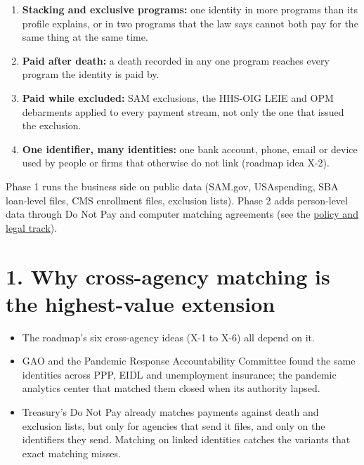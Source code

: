 \documentclass[letterpaper,11pt]{article}
\providecommand{\tightlist}{\setlength{\itemsep}{0pt}\setlength{\parskip}{0pt}}
\begin{document}
\begin{enumerate}
\def\labelenumi{\arabic{enumi}.}
\tightlist
\item
  \textbf{Stacking and exclusive programs:} one identity in more
  programs than its profile explains, or in two programs that the law
  says cannot both pay for the same thing at the same time.
\item
  \textbf{Paid after death:} a death recorded in any one program reaches
  every program the identity is paid by.
\item
  \textbf{Paid while excluded:} SAM exclusions, the HHS-OIG LEIE and OPM
  debarments applied to every payment stream, not only the one that
  issued the exclusion.
\item
  \textbf{One identifier, many identities:} one bank account, phone,
  email or device used by people or firms that otherwise do not link
  (roadmap idea X-2).
\end{enumerate}

Phase 1 runs the business side on public data (SAM.gov, USAspending, SBA
loan-level files, CMS enrollment files, exclusion lists). Phase 2 adds
person-level data through Do Not Pay and computer matching agreements
(see the \href{../policy/legal_track.pdf}{policy and legal track}).

\hypertarget{why-cross-agency-matching-is-the-highest-value-extension}{%
\section*{1. Why cross-agency matching is the highest-value
extension}\label{why-cross-agency-matching-is-the-highest-value-extension}}

\begin{itemize}
\tightlist
\item
  The roadmap's six cross-agency ideas (X-1 to X-6) all depend on it.
\item
  GAO and the Pandemic Response Accountability Committee found the same
  identities across PPP, EIDL and unemployment insurance; the pandemic
  analytics center that matched them closed when its authority lapsed.
\item
  Treasury's Do Not Pay already matches payments against death and
  exclusion lists, but only for agencies that send it files, and only on
  the identifiers they send. Matching on linked identities catches the
  variants that exact matching misses.
\end{itemize}
\end{document}
